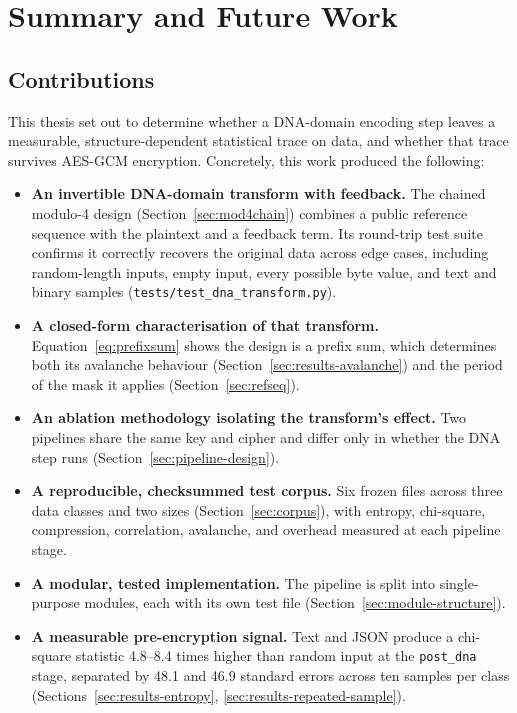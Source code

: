 \documentclass[12pt,a4paper,twoside]{report}
\numberwithin{equation}{chapter}
\begin{document}
\chapter{Summary and Future Work}
\label{ch:summary}

\section{Contributions}
This thesis set out to determine whether a DNA-domain encoding step
leaves a measurable, structure-dependent statistical trace on data,
and whether that trace survives AES-GCM encryption. Concretely, this
work produced the following:

\begin{itemize}
\item \textbf{An invertible DNA-domain transform with feedback.} The
chained modulo-4 design (Section~\ref{sec:mod4chain}) combines a
public reference sequence with the plaintext and a feedback term. Its
round-trip test suite confirms it correctly recovers the original data
across edge cases, including random-length inputs, empty input, every
possible byte value, and text and binary samples
(\texttt{tests/test\_dna\_transform.py}).

\item \textbf{A closed-form characterisation of that transform.}
Equation~\ref{eq:prefixsum} shows the design is a prefix sum, which
determines both its avalanche behaviour
(Section~\ref{sec:results-avalanche}) and the period of the mask it
applies (Section~\ref{sec:refseq}).

\item \textbf{An ablation methodology isolating the transform's
effect.} Two pipelines share the same key and cipher and differ only
in whether the DNA step runs (Section~\ref{sec:pipeline-design}).

\item \textbf{A reproducible, checksummed test corpus.} Six frozen
files across three data classes and two sizes
(Section~\ref{sec:corpus}), with entropy, chi-square, compression,
correlation, avalanche, and overhead measured at each pipeline stage.

\item \textbf{A modular, tested implementation.} The pipeline is split
into single-purpose modules, each with its own test file
(Section~\ref{sec:module-structure}).

\item \textbf{A measurable pre-encryption signal.} Text and JSON
produce a chi-square statistic 4.8--8.4 times higher than random
input at the \texttt{post\_dna} stage, separated by 48.1 and 46.9
standard errors across ten samples per class
(Sections~\ref{sec:results-entropy}, \ref{sec:results-repeated-sample}).


\end{itemize}
\end{document}
